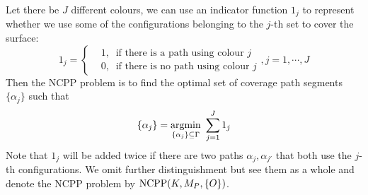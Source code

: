 \documentclass[letterpaper, 10pt, conference]{ieeeconf}
\begin{document}
Let there be $J$ different colours, we can use an indicator function $1_j$ to represent whether we use some of the configurations belonging to the $j$-th set to cover the surface: 
\begin{equation}
1_j =\left\{
\begin{aligned}
&1,\ \mbox{ if there is a path using colour }j\\
&0,\ \mbox{ if there is no path using colour }j 
\end{aligned}
\right., j = 1, \cdots, J
\end{equation}
Then the NCPP problem is to find the optimal set of coverage path segments $\{\alpha_j\}$ such that  
\begin{equation}\label{equ_NCPP}
\{\alpha_j\} = \mathop{{\rm argmin}}\limits_{\{\alpha_j\}\subseteq \Gamma}~\sum\limits_{j = 1}^J 1_j
\end{equation}
Note that $1_j$ will be added twice if there are two paths $\alpha_j, \alpha_{j'}$ that both use the $j$-th configurations. We omit further distinguishment but see them as a whole and denote the NCPP problem by ${\rm NCPP}(K, M_P, \{O\})$. 
\end{document}
